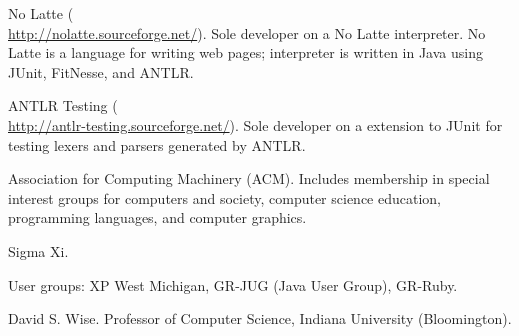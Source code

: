 \documentclass[ComputerScience]{vita}
\newcommand{\duphref}[1]{\href{#1}{#1}}
\begin{document}
\begin{vita}
\begin{software}
  \item No Latte (\\\duphref{http://nolatte.sourceforge.net/}).  Sole developer on a No Latte interpreter.  No Latte is a language for writing web pages; interpreter is written in Java using JUnit, FitNesse, and ANTLR.
  
  \item ANTLR Testing (\\\duphref{http://antlr-testing.sourceforge.net/}).  Sole developer on a extension to JUnit for testing lexers and parsers generated by ANTLR.

\end{software}

\begin{Memberships}

\item Association for Computing Machinery (ACM).  Includes membership in special interest groups for computers and society, computer science education, programming languages, and computer graphics.


\item Sigma Xi.

\item User groups: XP West Michigan, GR-JUG (Java User Group), GR-Ruby.

\end{Memberships}

\begin{References}

David S. Wise.  Professor of Computer Science, Indiana University (Bloomington).




\end{References}


\end{vita}
\end{document}
